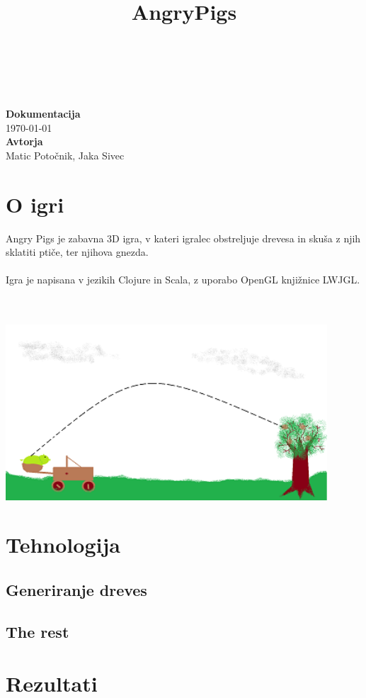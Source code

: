\documentclass[10pt,a4paper,oneside]{book}
\title{AngryPigs}
\newcommand\br{%
 \ \\ \ \\%
}
\begin{document}
\begin{titlepage}
\begin{center}
\ \\[3.5cm]
{}\\[-2.8cm]
{}\\[3.9cm]
{\Huge\bf Dokumentacija}\\[0.35cm]
{\huge\today}\ \\[4.5cm]
{\Huge {\bf Avtorja}}\\[0.35cm]
{\huge Matic Potočnik, Jaka Sivec}
\vfill
\end{center}
\end{titlepage}
\chapter{O igri}
Angry Pigs je zabavna 3D igra, v kateri igralec obstreljuje drevesa in skuša z njih sklatiti ptiče, ter njihova gnezda. 
\br
Igra je napisana v jezikih Clojure in Scala, z uporabo OpenGL knjižnice LWJGL.
\br
\begin{center}
\includegraphics[width=12cm]{conceptsmall}
\end{center}

\chapter{Tehnologija}

\section{Generiranje dreves}

\section{The rest}

\chapter{Rezultati}
\end{document}
